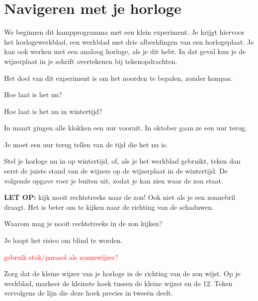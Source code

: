 \chapter{Navigeren met je horloge}

We beginnen dit kampprogramma met een klein experiment. Je krijgt hiervoor het horlogewerkblad, een werkblad met drie afbeeldingen van een horlogeplaat. Je kan ook werken met een analoog horloge, als je dit hebt. In dat geval kun je de wijzerplaat in je schrift overtekenen bij tekenopdrachten.

Het doel van dit experiment is om het noorden te bepalen, zonder kompas.

\begin{opgave}[\vinger]
    \begin{subopgave}
        Hoe laat is het nu?
    \end{subopgave}
    \begin{subopgave}
        Hoe laat is het nu in wintertijd?
        \begin{hint}
            In maart gingen alle klokken een uur vooruit. In oktober gaan ze een uur terug. 
        \end{hint}
        \begin{antwoord}
            Je moet een uur terug tellen van de tijd die het nu is.
        \end{antwoord}
    \end{subopgave}
\end{opgave}

Stel je horloge nu in op wintertijd, of, als je het werkblad gebruikt, teken dan eerst de juiste stand van de wijzers op de wijzerplaat in de wintertijd. De volgende opgave voer je buiten uit, zodat je kan zien waar de zon staat.

\textbf{LET OP:} kijk nooit rechtstreeks naar de zon! Ook niet als je een zonnebril draagt. Het is beter om te kijken naar de richting van de schaduwen.
\begin{opgave}[\discussie]
    Waarom mag je nooit rechtstreeks in de zon kijken?
    \begin{antwoord}
     Je loopt het risico om blind te worden.
    \end{antwoord}
\end{opgave}



\textcolor{red}{gebruik stok/parasol als zonnewijzer?}

\begin{opgave}[\schaar]
    Zorg dat de kleine wijzer van je horloge in de richting van de zon wijst. Op je werkblad, markeer de kleinste hoek tussen de kleine wijzer en de 12. Teken vervolgens de lijn die deze hoek precies in twee\"{e}n deelt.
\end{opgave}

